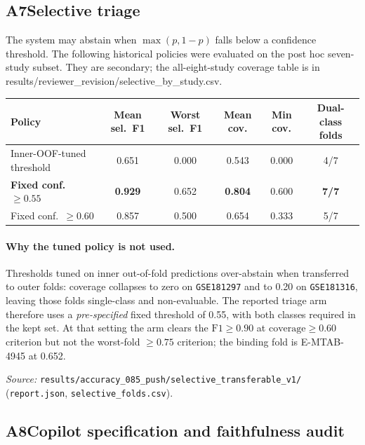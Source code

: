\subsection*{A7\quad Selective triage}
\label{app:selective}

The system may abstain when $\max(p, 1-p)$ falls below a confidence threshold.
The following historical policies were evaluated on the post hoc seven-study subset. They are secondary; the all-eight-study coverage table is in results/reviewer\_revision/selective\_by\_study.csv.

{\small
\begin{tabular}{@{}lccccc@{}}
\toprule
Policy & Mean sel.\ F1 & Worst sel.\ F1 & Mean cov. & Min cov. & Dual-class folds \\
\midrule
Inner-OOF-tuned threshold & 0.651 & 0.000 & 0.543 & 0.000 & 4/7 \\
\textbf{Fixed conf.\ $\geq0.55$} & \textbf{0.929} & 0.652 & \textbf{0.804} & 0.600 & \textbf{7/7} \\
Fixed conf.\ $\geq0.60$ & 0.857 & 0.500 & 0.654 & 0.333 & 5/7 \\
\bottomrule
\end{tabular}
}

\paragraph{Why the tuned policy is not used.} Thresholds tuned on inner
out-of-fold predictions over-abstain when transferred to outer folds: coverage
collapses to zero on \texttt{GSE181297} and to 0.20 on \texttt{GSE181316},
leaving those folds single-class and non-evaluable. The reported triage arm
therefore uses a \emph{pre-specified} fixed threshold of 0.55, with both
classes required in the kept set. At that setting the arm clears the
$\text{F1}\geq0.90$ at $\text{coverage}\geq0.60$ criterion but not the
worst-fold $\geq0.75$ criterion; the binding fold is E-MTAB-4945 at 0.652.

\medskip
\noindent\textit{Source:}
\texttt{results/accuracy\_085\_push/selective\_transferable\_v1/}
(\texttt{report.json}, \texttt{selective\_folds.csv}).

\subsection*{A8\quad Copilot specification and faithfulness audit}
\label{app:copilot}

